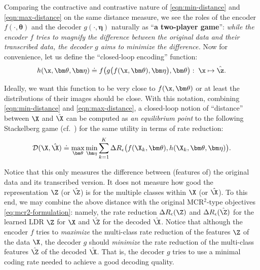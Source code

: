 \documentclass[../../book-main.tex]{subfiles}
\begin{document}
Comparing the contractive and contrastive nature of
\eqref{eqn:min-distance} and \eqref{eqn:max-distance} on the same
distance measure, we see the roles of the encoder $f(\cdot, \bm
\theta)$ and the decoder $g(\cdot, \bm \eta)$ naturally as ``{\bf a
two-player game}'': {\em while the encoder $f$ tries to magnify the
    difference between the original data and their transcribed data, the
decoder $g$ aims to minimize the difference.} Now for convenience,
let us define the ``closed-loop encoding'' function:
\begin{equation}
    h(\x, \bm \theta,\bm \eta) \doteq f\big(g\big(f(\x, \bm \theta),
    \bm \eta\big), \bm \theta\big): \; \x \mapsto \hat \z.
\end{equation}

Ideally, we want this function to be very close to $f(\x, \bm
\theta)$ or at least the distributions of their images should be
close. With this notation, combining \eqref{eqn:min-distance} and
\eqref{eqn:max-distance}, a closed-loop notion of ``distance''
between $\X$ and $\hat \X$ can be computed as {\em an equilibrium
point} to the following Stackelberg game (cf.\ ) for
the same utility in terms of rate reduction:
\begin{equation}
    \mathcal{D}(\X, \hat \X) \doteq  \max_{\bm \theta} \min_{\bm
    \eta} \sum_{k=1}^K \Delta R_\epsilon\big(f(\X_k,\bm \theta),
    h(\X_k,\bm \theta,\bm \eta)\big).
    \label{eq:MCR2-GAN-pair}
\end{equation}

Notice that this only measures the difference between (features of)
the original data and its transcribed version. It does not measure
how good the representation $\Z$ (or $\hat \Z$) is for the multiple
classes within $\X$ (or $\hat \X$). To this end, we may combine the
above distance with the original MCR$^2$-type objectives
\eqref{eq:mcr2-formulation}: namely, the rate reduction $\Delta
R_\epsilon(\Z)$ and $\Delta R_\epsilon(\hat \Z)$ for the learned LDR
$\Z$ for $\X$ and $\hat \Z$ for the decoded $\hat \X$. Notice that
although the encoder $f$ tries to {\em maximize} the multi-class rate
reduction of the features $\Z$ of the data $\X$, the decoder $g$
should {\em minimize} the rate reduction of the multi-class features
$\hat \Z$ of the decoded $\hat \X$. That is, the decoder $g$ tries to
use a minimal coding rate needed to achieve a good decoding quality.
\end{document}
